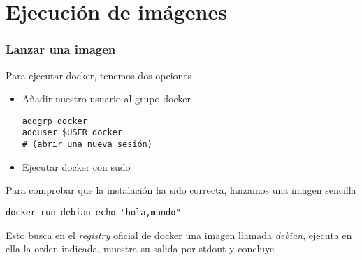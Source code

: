 \documentclass[ucs]{beamer}
\begin{document}
\section{Ejecución de imágenes}
\begin{frame}[fragile]
\frametitle{Lanzar una imagen}

Para ejecutar docker, tenemos dos opciones
\begin{itemize}
\item
Añadir nuestro usuario al grupo docker

  \begin{scriptsize}
  \begin{verbatim}
addgrp docker
adduser $USER docker
# (abrir una nueva sesión)
  \end{verbatim}
  \end{scriptsize}

\item
Ejecutar docker con sudo
\end{itemize}

Para comprobar que la instalación ha sido correcta, lanzamos una
imagen sencilla

  \begin{scriptsize}
  \begin{verbatim}
docker run debian echo "hola,mundo"
  \end{verbatim}
  \end{scriptsize}

Esto busca en el \emph{registry} oficial de docker una imagen
llamada \emph{debian}, ejecuta en ella la orden indicada, muestra
su salida por stdout y concluye


\end{frame}
\end{document}
